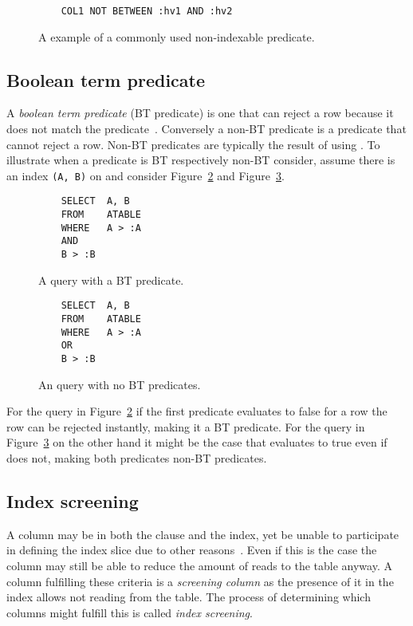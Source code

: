 \begin{figure}[ht]
  \begin{verbatim}
    COL1 NOT BETWEEN :hv1 AND :hv2
  \end{verbatim}
  \caption[An example of a non-indexable predicate]{A example of a commonly used
    non-indexable predicate.}\label{fig:sql:nonindexable}
\end{figure}

\subsection*{Boolean term predicate}
A \textit{boolean term predicate} (BT predicate) is one that can reject a row
because it does not match the
predicate~\cite{lahdenmaki_2005_relational_rdidatodossea}. Conversely a non-BT
predicate is a predicate that cannot reject a row. Non-BT predicates are
typically the result of using . To illustrate when a predicate is BT
respectively non-BT consider, assume there is an index \texttt{(A, B)} on
 and consider Figure~\ref{fig:sql:btpredicate} and
Figure~\ref{fig:sql:nonbtpredicate}.

\begin{figure}[ht]
  \begin{verbatim}
    SELECT  A, B
    FROM    ATABLE
    WHERE   A > :A
    AND
    B > :B
  \end{verbatim}
  \caption[A query containing a BT predicate]{A query with a BT
    predicate.}\label{fig:sql:btpredicate}
\end{figure}

\begin{figure}[ht]
  \begin{verbatim}
    SELECT  A, B
    FROM    ATABLE
    WHERE   A > :A
    OR
    B > :B
  \end{verbatim}
  \caption[A query containing no BT predicates]{An query with no BT
    predicates.}\label{fig:sql:nonbtpredicate}
\end{figure}

For the query in Figure~\ref{fig:sql:btpredicate} if the first predicate  evaluates to false for a row the row can be rejected instantly, making
it a BT predicate. For the query in Figure~\ref{fig:sql:nonbtpredicate} on the
other hand it might be the case that  evaluates to true even if
 does not, making both predicates non-BT predicates.

\subsection*{Index screening}
A column may be in both the  clause and the index, yet be unable to
participate in defining the index slice due to other
reasons~\cite{lahdenmaki_2005_relational_rdidatodossea}. Even if this is the
case the column may still be able to reduce the amount of reads to the table
anyway. A column fulfilling these criteria is a \textit{screening column} as the
presence of it in the index allows not reading from the table. The process of
determining which columns might fulfill this is called \textit{index screening}.

